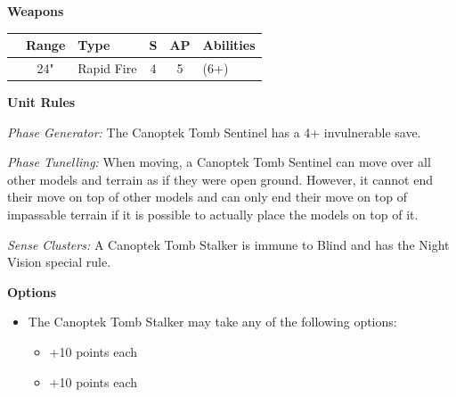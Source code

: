 \begin{minipage}[t]{0.72\textwidth}
	\vspace*{2em}
	\textbf{Weapons}
	
	\begin{tabular}{L{90 pt} c C{40pt} *{2}{c} >{\raggedright\arraybackslash}p{130pt}}
		& Range & Type & S & AP & Abilities \\
		\hline
		 & 24" & Rapid Fire & 4 & 5 &  (6+) \\
	\end{tabular}
	
	\vspace*{2em}
	\textbf{Unit Rules}
	
	\textit{Phase Generator:} The Canoptek Tomb Sentinel has a 4+ invulnerable save.
	
	\textit{Phase Tunelling:} When moving, a Canoptek Tomb Sentinel can move over all other models and terrain as if they were open ground. However, it cannot end their move on top of other models and can only end their move on top of impassable terrain if it is possible to actually place the models on top of it.
	
	\textit{Sense Clusters:} A Canoptek Tomb Stalker is immune to Blind and has the Night Vision special rule.	
	
	\vspace*{2em}
	\textbf{Options}
	\begin{itemize}
		\item The Canoptek Tomb Stalker may take any of the following options:
		\begin{itemize}
			\item {} \dotfill +10 points each
			\item {} \dotfill +10 points each
		\end{itemize}
	\end{itemize}
\end{minipage}




\newpage
\subsubsection[Canoptek Wraith Flight]{}

